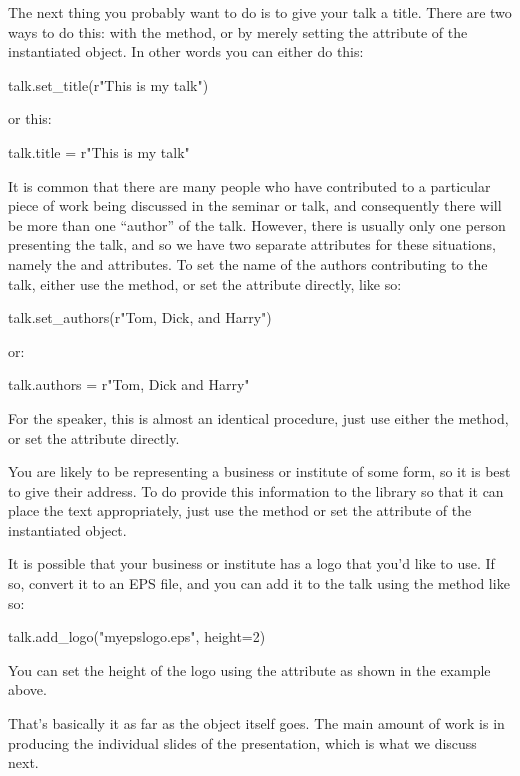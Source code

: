 The next thing you probably want to do is to give your talk a title.  There
are two ways to do this: with the  method, or by merely
setting the  attribute of the instantiated  object.
In other words you can either do this:
\begin{python}
talk.set_title(r"This is my talk")
\end{python}
or this:
\begin{python}
talk.title = r"This is my talk"
\end{python}

It is common that there are many people who have contributed to a particular
piece of work being discussed in the seminar or talk, and consequently there
will be more than one ``author'' of the talk.  However, there is usually
only one person presenting the talk, and so we have two separate attributes
for these situations, namely the  and  attributes.
To set the name of the authors contributing to the talk, either use the
 method, or set the attribute directly, like so:
\begin{python}
talk.set_authors(r"Tom, Dick, and Harry")
\end{python}
or:
\begin{python}
talk.authors = r"Tom, Dick and Harry"
\end{python}
For the speaker, this is almost an identical procedure, just use either the
 method, or set the  attribute directly.

You are likely to be representing a business or institute of some form, so
it is best to give their address.  To do provide this information to the
 library so that it can place the text appropriately, just
use the  method or set the  attribute of
the instantiated  object.

It is possible that your business or institute has a logo that you'd like to
use.  If so, convert it to an EPS file, and you can add it to the talk using
the  method like so:
\begin{python}
talk.add_logo("myepslogo.eps", height=2)
\end{python}
You can set the height of the logo using the  attribute as shown
in the example above.

That's basically it as far as the  object itself goes.  The main
amount of work is in producing the individual slides of the presentation,
which is what we discuss next.

